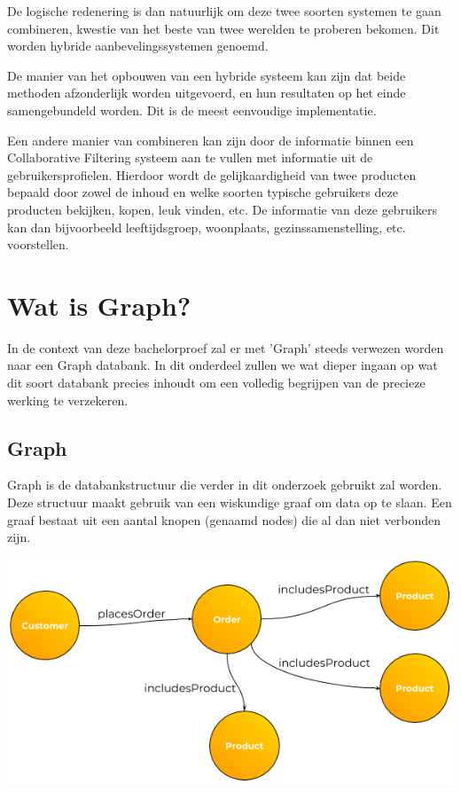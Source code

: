 De logische redenering is dan natuurlijk om deze twee soorten systemen te gaan combineren, kwestie van het beste van twee werelden te proberen bekomen. Dit worden hybride aanbevelingssystemen \autocite{Cano2017} genoemd.

De manier van het opbouwen van een hybride systeem kan zijn dat beide methoden afzonderlijk worden uitgevoerd, en hun resultaten op het einde samengebundeld worden. Dit is de meest eenvoudige implementatie.

Een andere manier van combineren kan zijn door de informatie binnen een Collaborative Filtering systeem aan te vullen met informatie uit de gebruikersprofielen. Hierdoor wordt de gelijkaardigheid van twee producten bepaald door zowel de inhoud en welke soorten typische gebruikers deze producten bekijken, kopen, leuk vinden, etc.
De informatie van deze gebruikers kan dan bijvoorbeeld leeftijdsgroep, woonplaats, gezinssamenstelling, etc. voorstellen.


\section{Wat is Graph?}
\label{sec:wat is Graph?}

In de context van deze bachelorproef zal er met 'Graph' steeds verwezen worden naar een Graph databank. In dit onderdeel zullen we wat dieper ingaan op wat dit soort databank precies inhoudt om een volledig begrijpen van de precieze werking te verzekeren. 

\subsection{Graph}
\label{sec:Graph}

Graph is de databankstructuur die verder in dit onderzoek gebruikt zal worden. Deze structuur maakt gebruik van een wiskundige graaf om data op te slaan. Een graaf bestaat uit een aantal knopen (genaamd nodes) die al dan niet verbonden zijn. 

\includegraphics[width=\linewidth]{img/Customer-Order-Example-Graph.png}

